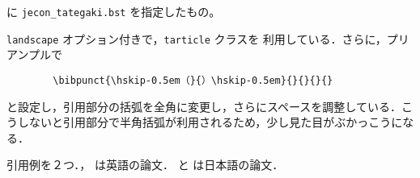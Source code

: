 \documentclass[landscape,10pt]{tarticle}
\begin{document}
\verb|| に \verb|jecon_tategaki.bst| を指定したもの。
\vspace*{1em}

\texttt{landscape} オプション付きで，\texttt{tarticle} クラスを
利用している．さらに，プリアンプルで
\begin{verbatim}
        \bibpunct{\hskip-0.5em（}{）\hskip-0.5em}{}{}{}{}
\end{verbatim}
と設定し，引用部分の括弧を全角に変更し，さらにスペースを調整している．こ
うしないと引用部分で半角括弧が利用されるため，少し見た目がぶかっこうにな
る．
\vspace*{2em}


引用例を２つ．\citet{ishikawa03:_green_gas_emiss_contr_open_econom}，
\citet{takeda06:_cge_analy_welfar_effec_trade} は英語の論文．
\citet{oyama99:_mark_stru} と \citet{kuroda97jp:keo} は日本語の論文．

\nocite{*}





% 
\end{document}

